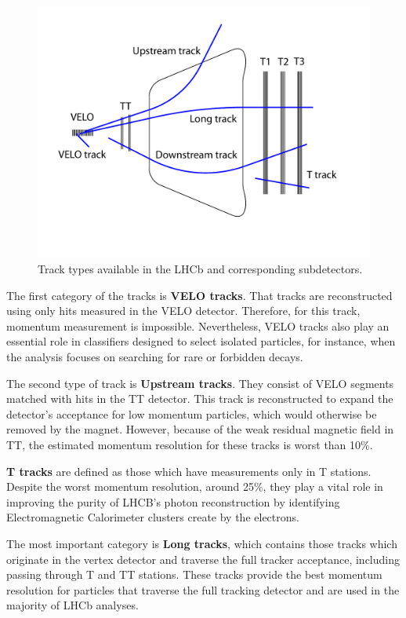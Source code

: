 \begin{figure}
\centering
\includegraphics[scale=0.9]{figures/trackTypes.pdf}
\caption{Track types available in the LHCb and corresponding subdetectors. 
\label{fig:track_types}}
\end{figure}

The first category of the tracks is \textbf{VELO tracks}. That tracks are reconstructed using only hits measured in the VELO detector. Therefore, for this track, momentum measurement is impossible. Nevertheless, VELO tracks also play an essential role in classifiers designed to select isolated particles, for instance, when the analysis focuses on searching for rare or forbidden decays. 

The second type of track is \textbf{Upstream tracks}. They consist of VELO segments matched with hits in the TT detector. This track is reconstructed to expand the detector's acceptance for low momentum particles, which would otherwise be removed by the magnet. However, because of the weak residual magnetic field in TT, the estimated momentum resolution for these tracks is worst than 10\%.

\textbf{T tracks} are defined as those which have measurements only in T stations. Despite the worst momentum resolution, around 25\%, they play a vital role in improving the purity of LHCB's photon reconstruction by identifying Electromagnetic Calorimeter clusters create by the electrons. 

The most important category is \textbf{Long tracks}, which contains those tracks which originate in the vertex detector and traverse the full tracker acceptance, including passing through T and TT stations. These tracks provide the best momentum resolution for particles that traverse the full tracking detector and are used in the majority of LHCb analyses.

